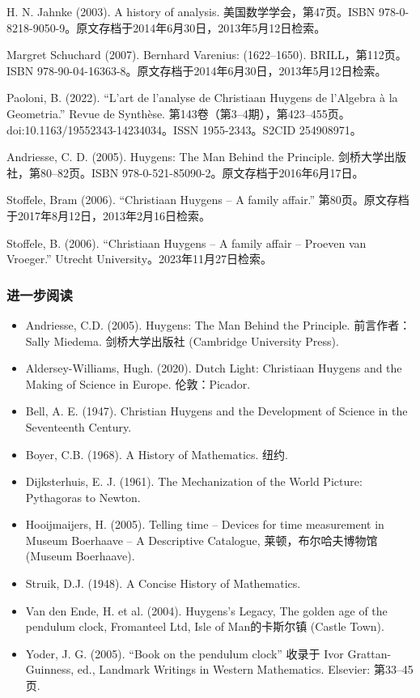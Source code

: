 \begin{enumerate}
H. N. Jahnke (2003). A history of analysis. 美国数学学会，第47页。ISBN 978-0-8218-9050-9。原文存档于2014年6月30日，2013年5月12日检索。

Margret Schuchard (2007). Bernhard Varenius: (1622–1650). BRILL，第112页。ISBN 978-90-04-16363-8。原文存档于2014年6月30日，2013年5月12日检索。

Paoloni, B. (2022). “L'art de l'analyse de Christiaan Huygens de l'Algebra à la Geometria.” Revue de Synthèse. 第143卷（第3–4期），第423–455页。doi:10.1163/19552343-14234034。ISSN 1955-2343。S2CID 254908971。

Andriesse, C. D. (2005). Huygens: The Man Behind the Principle. 剑桥大学出版社，第80–82页。ISBN 978-0-521-85090-2。原文存档于2016年6月17日。

Stoffele, Bram (2006). “Christiaan Huygens – A family affair.” 第80页。原文存档于2017年8月12日，2013年2月16日检索。

Stoffele, B. (2006). “Christiaan Huygens – A family affair – Proeven van Vroeger.” Utrecht University。2023年11月27日检索。













\end{enumerate}


\subsubsection{进一步阅读}
\begin{itemize}
\item Andriesse, C.D. (2005). Huygens: The Man Behind the Principle. 前言作者：Sally Miedema. 剑桥大学出版社 (Cambridge University Press).
\item Aldersey-Williams, Hugh. (2020). Dutch Light: Christiaan Huygens and the Making of Science in Europe. 伦敦：Picador.
\item Bell, A. E. (1947). Christian Huygens and the Development of Science in the Seventeenth Century.
\item Boyer, C.B. (1968). A History of Mathematics. 纽约.
\item Dijksterhuis, E. J. (1961). The Mechanization of the World Picture: Pythagoras to Newton.
\item Hooijmaijers, H. (2005). Telling time – Devices for time measurement in Museum Boerhaave – A Descriptive Catalogue, 莱顿，布尔哈夫博物馆 (Museum Boerhaave).
\item Struik, D.J. (1948). A Concise History of Mathematics.
\item Van den Ende, H. et al. (2004). Huygens's Legacy, The golden age of the pendulum clock, Fromanteel Ltd, Isle of Man的卡斯尔镇 (Castle Town).
\item Yoder, J. G. (2005). “Book on the pendulum clock” 收录于 Ivor Grattan-Guinness, ed., Landmark Writings in Western Mathematics. Elsevier: 第33–45页.
\end{itemize}